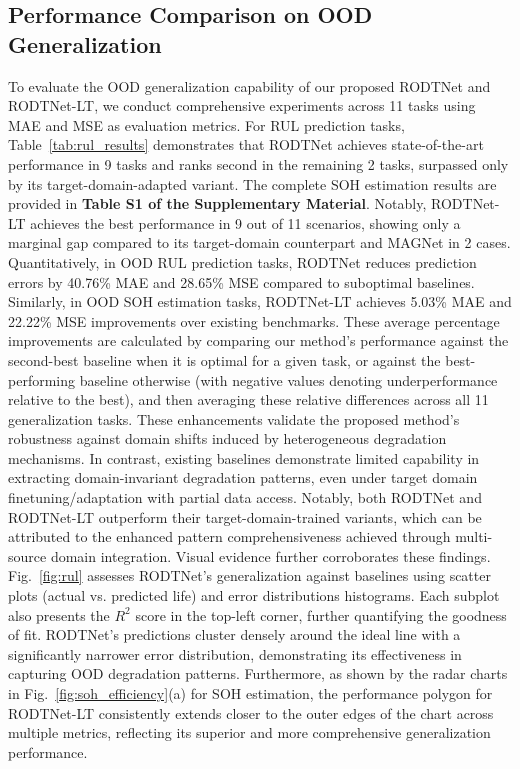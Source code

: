 \documentclass[lettersize,journal]{IEEEtran}
\begin{document}
\subsection{Performance Comparison on OOD Generalization}\label{subsec:comparative_experiments}

To evaluate the OOD generalization capability of our proposed RODTNet and RODTNet-LT, we conduct comprehensive experiments across 11 tasks using MAE and MSE as evaluation metrics. For RUL prediction tasks, Table~\ref{tab:rul_results} demonstrates that RODTNet achieves state-of-the-art performance in 9 tasks and ranks second in the remaining 2 tasks, surpassed only by its target-domain-adapted variant.
% 
The complete SOH estimation results are provided in \textbf{Table S1 of the Supplementary Material}. Notably, RODTNet-LT achieves the best performance in 9 out of 11 scenarios, showing only a marginal gap compared to its target-domain counterpart and MAGNet in 2 cases.
% 
Quantitatively, in OOD RUL prediction tasks, RODTNet reduces prediction errors by 40.76\% MAE and 28.65\% MSE compared to suboptimal baselines. Similarly, in OOD SOH estimation tasks, RODTNet-LT achieves 5.03\% MAE and 22.22\% MSE improvements over existing benchmarks. These average percentage improvements are calculated by comparing our method's performance against the second-best baseline when it is optimal for a given task, or against the best-performing baseline otherwise (with negative values denoting underperformance relative to the best), and then averaging these relative differences across all 11 generalization tasks. These enhancements validate the proposed method's robustness against domain shifts induced by heterogeneous degradation mechanisms.
% 
In contrast, existing baselines demonstrate limited capability in extracting domain-invariant degradation patterns, even under target domain finetuning/adaptation with partial data access. Notably, both RODTNet and RODTNet-LT outperform their target-domain-trained variants, which can be attributed to the enhanced pattern comprehensiveness achieved through multi-source domain integration.
% 
Visual evidence further corroborates these findings.
Fig.~\ref{fig:rul} assesses RODTNet's generalization against baselines using scatter plots (actual vs. predicted life) and error distributions histograms. Each subplot also presents the $R^{2}$ score in the top-left corner, further quantifying the goodness of fit. RODTNet's predictions cluster densely around the ideal line with a significantly narrower error distribution, demonstrating its effectiveness in capturing OOD degradation patterns. Furthermore, as shown by the radar charts in Fig.~\ref{fig:soh_efficiency}(a) for SOH estimation, the performance polygon for RODTNet-LT consistently extends closer to the outer edges of the chart across multiple metrics, reflecting its superior and more comprehensive generalization performance.
\end{document}
